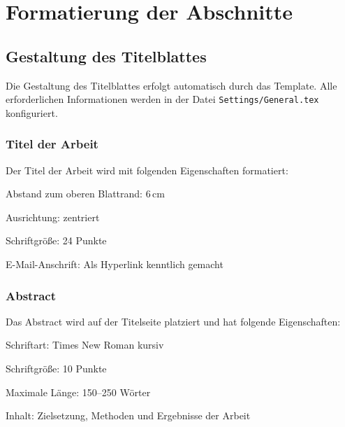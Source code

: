 
\chapter{Formatierung der Abschnitte}
\label{chap:formatierung_abschnitte}

\section{Gestaltung des Titelblattes}
\label{sec:titelblatt}

Die Gestaltung des Titelblattes erfolgt automatisch durch das Template. Alle erforderlichen Informationen werden in der Datei \texttt{Settings/General.tex} konfiguriert.

\subsection{Titel der Arbeit}
\label{subsec:titel_arbeit}

Der Titel der Arbeit wird mit folgenden Eigenschaften formatiert:
\begin{listenabsatz}
	\item Abstand zum oberen Blattrand: 6\,cm
	\item Ausrichtung: zentriert
	\item Schriftgröße: 24 Punkte
	\item E-Mail-Anschrift: Als Hyperlink kenntlich gemacht
\end{listenabsatz}

\subsection{Abstract}
\label{subsec:abstract}

Das Abstract wird auf der Titelseite platziert und hat folgende Eigenschaften:
\begin{listenabsatz}
	\item Schriftart: Times New Roman kursiv
	\item Schriftgröße: 10 Punkte
	\item Maximale Länge: 150--250 Wörter
	\item Inhalt: Zielsetzung, Methoden und Ergebnisse der Arbeit
\end{listenabsatz}

